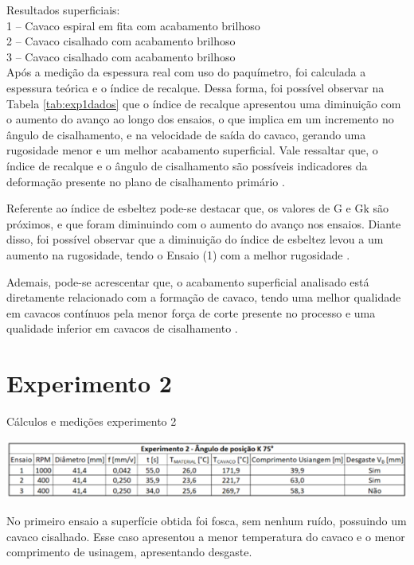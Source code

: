 \documentclass[deposito, acronym, symbols]{fei}
\begin{document}
 Resultados superficiais: \\
1 – Cavaco espiral em fita com acabamento brilhoso\\
2 – Cavaco cisalhado com acabamento brilhoso\\
3 – Cavaco cisalhado com acabamento brilhoso\\

Após a medição da espessura real com uso do paquímetro, foi calculada a espessura teórica e o índice de recalque. Dessa forma, foi possível observar na Tabela \ref{tab:exp1dados} que o índice de recalque apresentou uma diminuição com o aumento do avanço ao longo dos ensaios, o que implica em um incremento no ângulo de cisalhamento, e na velocidade de saída do cavaco, gerando uma rugosidade menor e um melhor acabamento superficial. Vale ressaltar que, o índice de recalque e o ângulo de cisalhamento são possíveis indicadores da deformação presente no plano de cisalhamento primário \cite{hoffmann2020influencia}.  

Referente ao índice de esbeltez pode-se destacar que, os valores de G e Gk são próximos, e que foram diminuindo com o aumento do avanço nos ensaios. Diante disso, foi possível observar que a diminuição do índice de esbeltez levou a um aumento na rugosidade, tendo o Ensaio (1) com a melhor rugosidade \cite{dainfluencia}.

Ademais, pode-se acrescentar que, o acabamento superficial analisado está diretamente relacionado com a formação de cavaco, tendo uma melhor qualidade em cavacos contínuos pela menor força de corte presente no processo e uma qualidade inferior em cavacos de cisalhamento \cite{de2009analise}. 

\section{Experimento 2}

\begin{table}[!htb]
 \centering
    \caption{Cálculos e medições experimento 2}
    \includegraphics[width=1\linewidth]{Imagens/exp03_exp2dados.png}
    \label{tab:exp2dados}
 \end{table}
 
No primeiro ensaio a superfície obtida foi fosca, sem nenhum ruído, possuindo um cavaco cisalhado. Esse caso apresentou a menor temperatura do cavaco e o menor comprimento de usinagem, apresentando desgaste.
\end{document}
